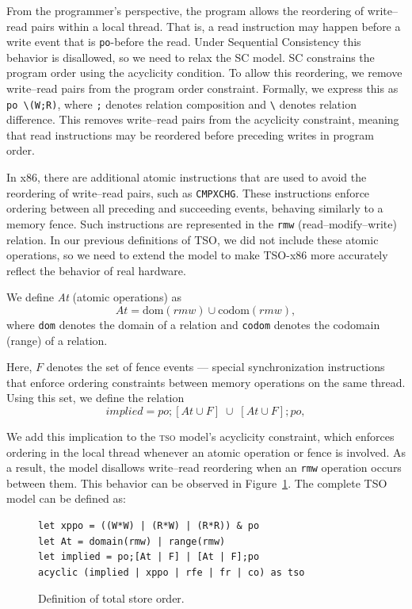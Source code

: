 From the programmer's perspective, the program allows the reordering of
write--read pairs within a local thread. That is, a read instruction may happen
before a write event that is \texttt{po}-before the read. Under Sequential
Consistency this behavior is disallowed, so we need to relax the SC model. SC
constrains the program order using the acyclicity condition. To allow this
reordering, we remove write--read pairs from the program order constraint.
Formally, we express this as \texttt{po \textbackslash (W;R)}, where \texttt{;}
denotes relation composition and \texttt{\textbackslash} denotes relation
difference. This removes write--read pairs from the acyclicity constraint,
meaning that read instructions may be reordered before preceding writes in
program order.

In x86, there are additional atomic instructions that are used to avoid the
reordering of write--read pairs, such as \texttt{CMPXCHG}. These instructions
enforce ordering between all preceding and succeeding events, behaving
similarly to a memory fence. Such instructions are represented in the
\texttt{rmw} (read--modify--write) relation. In our previous definitions of
TSO, we did not include these atomic operations, so we need to extend the model
to make TSO-x86 more accurately reflect the behavior of real hardware.

We define \textit{At} (atomic operations) as
\[
\mathit{At} = \mathrm{dom}(\mathit{rmw}) \cup \mathrm{codom}(\mathit{rmw}),
\]
where \texttt{dom} denotes the domain of a relation and \texttt{codom} denotes
the codomain (range) of a relation.

Here, $F$ denotes the set of fence events — special synchronization instructions that enforce ordering constraints between memory operations on the same thread. Using this set, we define the relation
\[
\mathit{implied} = \mathit{po}\mathbin{;}[\mathit{At} \cup F] \;\cup\; [\mathit{At} \cup F]\mathbin{;}\mathit{po},
\]

We add this implication to the \textsc{tso} model's acyclicity constraint, which enforces ordering in the local thread whenever an atomic operation or fence is involved. As a result, the model disallows write--read reordering when an \texttt{rmw} operation occurs between them. This behavior can be observed in
Figure~\ref{fig:tso}. The complete TSO model can be defined as:

\begin{figure}[htbp]
\centering
\begin{verbatim}
let xppo = ((W*W) | (R*W) | (R*R)) & po
let At = domain(rmw) | range(rmw)
let implied = po;[At | F] | [At | F];po
acyclic (implied | xppo | rfe | fr | co) as tso
\end{verbatim}
\caption{Definition of total store order.}
\label{fig:tso}
\end{figure}

